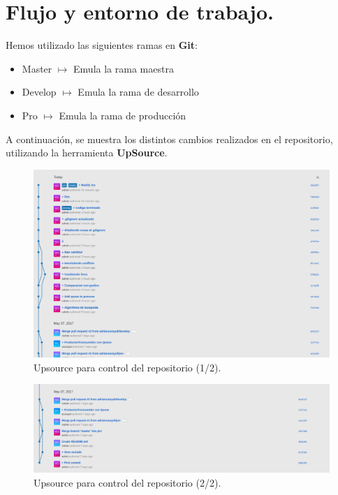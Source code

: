 \documentclass[a4,12pt]{article}
\begin{document}
	\section{Flujo y entorno de trabajo.}
	Hemos utilizado las siguientes ramas en \textbf{Git}:
	
	\begin{itemize}
		\item Master $\mapsto$ Emula la rama maestra
		\item Develop $\mapsto$ Emula la rama de desarrollo
		\item Pro $\mapsto$ Emula la rama de producción
	\end{itemize}
	
	A continuación, se muestra los distintos cambios realizados en el repositorio, utilizando la herramienta \textbf{UpSource}.
			\begin{figure}[t]
				\begin{center}
					\includegraphics[scale=0.7, width=180mm]{pic3.png}
					\caption{Upsource para control del repositorio (1/2).}
				\end{center}
			\end{figure}
			\FloatBarrier
			
			
			\begin{figure}[t]
				\begin{center}
					\includegraphics[scale=0.7, width=180mm]{pic4.png}
					\caption{Upsource para control del repositorio (2/2).}
				\end{center}
			\end{figure}
			\FloatBarrier
					
\end{document}
